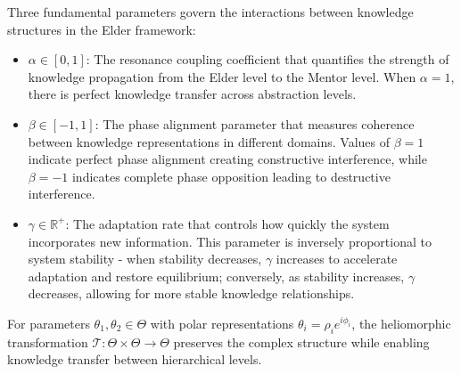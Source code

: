 \begin{definition}
Three fundamental parameters govern the interactions between knowledge structures in the Elder framework:

\begin{itemize}
    \item $\alpha \in [0,1]$: The resonance coupling coefficient that quantifies the strength of knowledge propagation from the Elder level to the Mentor level. When $\alpha = 1$, there is perfect knowledge transfer across abstraction levels.
    
    \item $\beta \in [-1,1]$: The phase alignment parameter that measures coherence between knowledge representations in different domains. Values of $\beta = 1$ indicate perfect phase alignment creating constructive interference, while $\beta = -1$ indicates complete phase opposition leading to destructive interference.
    
    \item $\gamma \in \mathbb{R}^+$: The adaptation rate that controls how quickly the system incorporates new information. This parameter is inversely proportional to system stability - when stability decreases, $\gamma$ increases to accelerate adaptation and restore equilibrium; conversely, as stability increases, $\gamma$ decreases, allowing for more stable knowledge relationships.
\end{itemize}
\end{definition}

\begin{theorem}
\label{thm:heliomorphic_transformation}
For parameters $\theta_1, \theta_2 \in \Theta$ with polar representations $\theta_i = \rho_i e^{i\phi_i}$, the heliomorphic transformation $\mathcal{T}: \Theta \times \Theta \rightarrow \Theta$ preserves the complex structure while enabling knowledge transfer between hierarchical levels.
\end{theorem}


